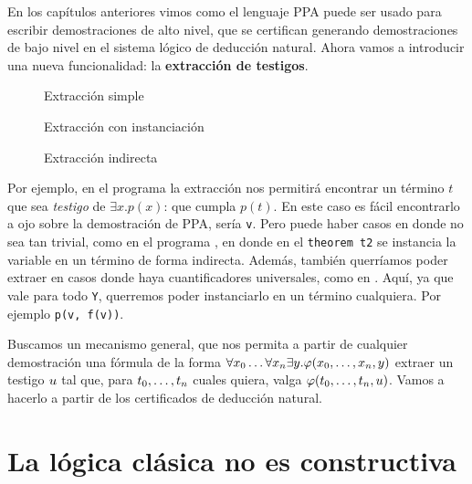 En los capítulos anteriores vimos como el lenguaje PPA puede ser usado para
escribir demostraciones de alto nivel, que se certifican generando
demostraciones de bajo nivel en el sistema lógico de deducción natural.
Ahora vamos a introducir una nueva funcionalidad: la \textbf{extracción de testigos}.

\begin{multicols}{2}
    \begin{figure}[H]
        
        \caption{Extracción simple}
        \label{fri:prog:exists}
    \end{figure}

    \begin{figure}[H]
        
        \caption{Extracción con instanciación}
        \label{fri:prog:forall}
    \end{figure}
    \begin{figure}[H]
        
        \caption{Extracción indirecta}
        \label{fri:prog:indirect}
    \end{figure}
\end{multicols}

Por ejemplo, en el programa  la extracción nos
permitirá encontrar un término $t$ que sea \textit{testigo} de $\exists x. p(x)$: que cumpla $p(t)$. En este caso es fácil encontrarlo a ojo sobre la
demostración de PPA, sería \lstinline{v}. Pero puede haber casos en donde no sea
tan trivial, como en el programa , en donde en el
\lstinline{theorem t2} se instancia la variable en un término de forma
indirecta. Además, también querríamos poder extraer en casos donde haya
cuantificadores universales, como en . Aquí, ya que vale para todo \lstinline{Y}, querremos poder instanciarlo en un término cualquiera. Por ejemplo \lstinline{p(v, f(v))}.

Buscamos un mecanismo general, que nos permita a partir de cualquier
demostración una fórmula de la forma $\forall x_0 \dots \forall x_n
\exists y . \varphi(x_0, \dots, x_n, y)$ extraer un testigo $u$ tal que, para $t_0, \dots, t_n$ cuales quiera, valga $\varphi(t_0, \dots, t_n, u)$. Vamos a hacerlo a partir
de los certificados de deducción natural.

\section{La lógica clásica no es constructiva}

